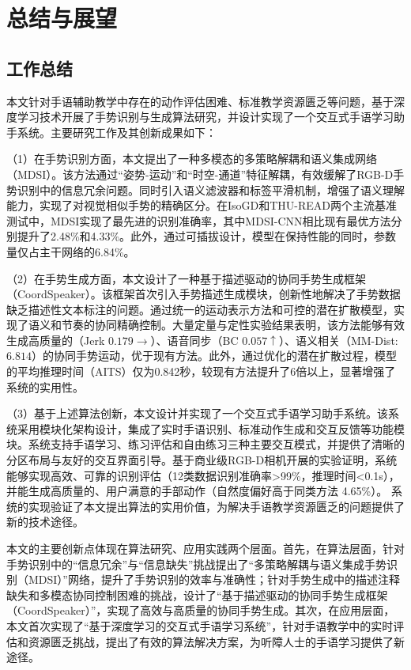 
\chapter{总结与展望}
\label{sec:summary}

\section{工作总结}
本文针对手语辅助教学中存在的动作评估困难、标准教学资源匮乏等问题，基于深度学习技术开展了手势识别与生成算法研究，并设计实现了一个交互式手语学习助手系统。主要研究工作及其创新成果如下：

（1）在手势识别方面，本文提出了一种多模态的多策略解耦和语义集成网络（MDSI）。该方法通过“姿势-运动”和“时空-通道”特征解耦，有效缓解了RGB-D手势识别中的信息冗余问题。同时引入语义滤波器和标签平滑机制，增强了语义理解能力，实现了对视觉相似手势的精确区分。在IsoGD和THU-READ两个主流基准测试中，MDSI实现了最先进的识别准确率，其中MDSI-CNN相比现有最优方法分别提升了2.48\%和4.33\%。此外，通过可插拔设计，模型在保持性能的同时，参数量仅占主干网络的6.84\%。

（2）在手势生成方面，本文设计了一种基于描述驱动的协同手势生成框架（CoordSpeaker）。该框架首次引入手势描述生成模块，创新性地解决了手势数据缺乏描述性文本标注的问题。通过统一的运动表示方法和可控的潜在扩散模型，实现了语义和节奏的协同精确控制。大量定量与定性实验结果表明，该方法能够有效生成高质量的（Jerk $0.179\rightarrow$）、语音同步（BC $0.057\uparrow$）、语义相关（MM-Dist: $6.814$）的协同手势运动，优于现有方法。此外，通过优化的潜在扩散过程，模型的平均推理时间（AITS）仅为0.842秒，较现有方法提升了6倍以上，显著增强了系统的实用性。

（3）基于上述算法创新，本文设计并实现了一个交互式手语学习助手系统。该系统采用模块化架构设计，集成了实时手语识别、标准动作生成和交互反馈等功能模块。系统支持手语学习、练习评估和自由练习三种主要交互模式，并提供了清晰的分区布局与友好的交互界面引导。基于商业级RGB-D相机开展的实验证明，系统能够实现高效、可靠的识别评估（12类数据识别准确率\textgreater 99\%，推理时间\textless 0.1s），并能生成高质量的、用户满意的手部动作（自然度偏好高于同类方法 4.65\%）。
系统的实现验证了本文提出算法的实用价值，为解决手语教学资源匮乏的问题提供了新的技术途径。

本文的主要创新点体现在算法研究、应用实践两个层面。首先，在算法层面，针对手势识别中的“信息冗余”与“信息缺失”挑战提出了“多策略解耦与语义集成手势识别（MDSI）”网络，提升了手势识别的效率与准确性；针对手势生成中的描述注释缺失和多模态协同控制困难的挑战，设计了“基于描述驱动的协同手势生成框架（CoordSpeaker）”，实现了高效与高质量的协同手势生成。其次，在应用层面，本文首次实现了“基于深度学习的交互式手语学习系统”，针对手语教学中的实时评估和资源匮乏挑战，提出了有效的算法解决方案，为听障人士的手语学习提供了新途径。

